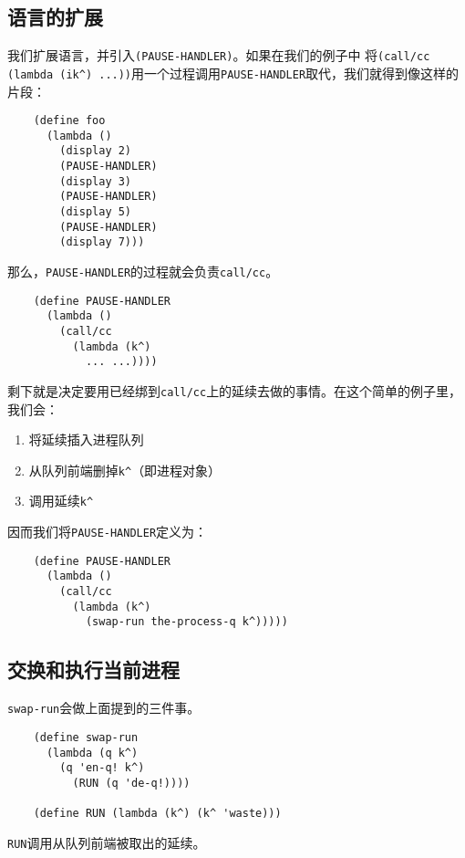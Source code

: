 \documentclass[12pt]{article}
\begin{document}
\subsection{语言的扩展}
\indent{}我们扩展语言，并引入\texttt{(PAUSE-HANDLER)}。如果在我们的例子中
将\texttt{(call/cc (lambda (ik\^{}) ...))}用一个过程调用\texttt{PAUSE-HANDLER}取代，我们就得到像这样的片段：
\begin{verbatim}
    (define foo
      (lambda ()
        (display 2)
        (PAUSE-HANDLER)
        (display 3)
        (PAUSE-HANDLER)
        (display 5)
        (PAUSE-HANDLER)
        (display 7)))
\end{verbatim}
\noindent{}那么，\texttt{PAUSE-HANDLER}的过程就会负责\texttt{call/cc}。
\begin{verbatim}
    (define PAUSE-HANDLER
      (lambda ()
        (call/cc
          (lambda (k^)
            ... ...))))
\end{verbatim}
\noindent{}剩下就是决定要用已经绑到\texttt{call/cc}上的延续去做的事情。在这个简单的例子里，我们会：
\begin{enumerate}
\item 将延续插入进程队列
\item 从队列前端删掉\texttt{k\^{}}（即进程对象）
\item 调用延续\texttt{k\^{}}
\end{enumerate}
因而我们将\texttt{PAUSE-HANDLER}定义为：
\begin{verbatim}
    (define PAUSE-HANDLER
      (lambda ()
        (call/cc
          (lambda (k^)
            (swap-run the-process-q k^)))))
\end{verbatim}

\subsection{交换和执行当前进程}
\noindent{}\texttt{swap-run}会做上面提到的三件事。
\begin{verbatim}
    (define swap-run
      (lambda (q k^)
        (q 'en-q! k^)
          (RUN (q 'de-q!))))

    (define RUN (lambda (k^) (k^ 'waste)))
\end{verbatim}
\noindent{}\texttt{RUN}调用从队列前端被取出的延续。
\end{document}
